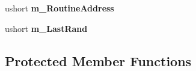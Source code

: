 \begin{DoxyCompactItemize}
\item 
\hypertarget{class_eimu_1_1_core_1_1_systems_1_1_s_chip8_1_1_code_engine_a7e9eff1df70f6f6e0fc374aeac55226d}{
ushort {\bfseries m\_\-RoutineAddress}}
\label{class_eimu_1_1_core_1_1_systems_1_1_s_chip8_1_1_code_engine_a7e9eff1df70f6f6e0fc374aeac55226d}

\item 
\hypertarget{class_eimu_1_1_core_1_1_systems_1_1_s_chip8_1_1_code_engine_a4f9b19faf4b176d9ddc01b38bccbf7eb}{
ushort {\bfseries m\_\-LastRand}}
\label{class_eimu_1_1_core_1_1_systems_1_1_s_chip8_1_1_code_engine_a4f9b19faf4b176d9ddc01b38bccbf7eb}

\end{DoxyCompactItemize}
\subsection*{Protected Member Functions}
